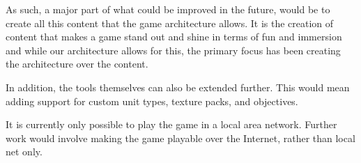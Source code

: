 As such, a major part of what could be improved in the future, would be to create all this content that the game architecture allows.
It is the creation of content that makes a game stand out and shine in terms of fun and immersion and while our architecture allows for this, the primary focus has been creating the architecture over the content. 

In addition, the tools themselves can also be extended further.
This would mean adding support for custom unit types, texture packs, and objectives.

It is currently only possible to play the game in a local area network.
Further work would involve making the game playable over the Internet, rather than local net only.
